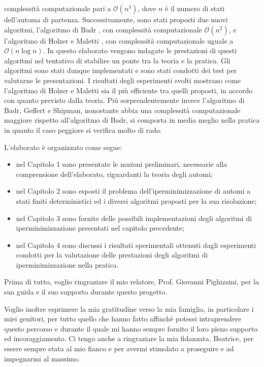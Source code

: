 \documentclass[a4paper,12pt]{report} %
\newcommand{\bigo}[0]{\mathcal{O}}            %
\begin{document}
complessità computazionale pari a $\bigo(n^3)$, dove $n$ è il numero di stati dell'automa di partenza.
Successivamente, sono stati proposti due nuovi algoritmi, l'algoritmo di Badr \parencite{Badr}, con complessità
computazionale $\bigo(n^2)$, e l'algoritmo di Holzer e Maletti \parencite{HM10}, con complessità computazionale 
uguale a $\bigo(n \log n)$. In questo elaborato vengono indagate le prestazioni di questi
algoritmi nel tentativo di stabilire un ponte tra la teoria e la pratica. Gli algoritmi sono stati
dunque implementati e sono stati condotti dei test per valutarne le presentazioni.
I risultati degli esperimenti svolti mostrano come l'algoritmo di Holzer e Maletti sia il più efficiente tra quelli proposti, 
in accordo con quanto previsto dalla teoria. Più sorprendentemente invece l'algoritmo di Badr, Geffert e Shipman, 
nonostante abbia una complessità computazionale maggiore rispetto all'algoritmo di Badr, 
si comporta in media meglio nella pratica in quanto il caso peggiore si verifica molto di rado.

L'elaborato è organizzato come segue:
\begin{itemize}
  \item nel Capitolo 1 sono presentate le nozioni preliminari, necessarie alla comprensione dell'elaborato,
  riguardanti la teoria degli automi;
  \item nel Capitolo 2 sono esposti il problema dell'iperminimizzazione di automi a stati finiti deterministici
  ed i diversi algoritmi proposti per la sua risoluzione;
  \item nel Capitolo 3 sono fornite delle possibili implementazioni degli algoritmi di iperminimizzazione
  presentati nel capitolo precedente;
  \item nel Capitolo 4 sono discussi i risultati sperimentali ottenuti dagli esperimenti condotti per la valutazione
  delle prestazioni degli algoritmi di iperminimizzazione nella pratica.
\end{itemize}



Prima di tutto, voglio ringraziare il mio relatore, Prof. Giovanni Pighizzini,
per la sua guida e il suo supporto durante questo progetto.

Voglio inoltre esprimere la mia gratitudine verso la mia famiglia, in particolare i miei genitori, per 
tutto quello che hanno fatto affinchè potessi intraprendere questo percorso e durante 
il quale mi hanno sempre fornito il loro pieno supporto ed incoraggiamento.
Ci tengo anche a ringraziare la mia fidanzata, Beatrice, per essere sempre stata al mio fianco
e per avermi stimolato a proseguire e ad impegnarmi al massimo.
\end{document}
